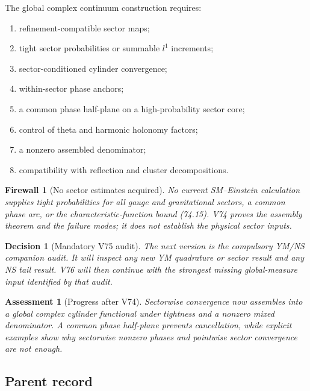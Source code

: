 \documentclass[11pt]{article}
\newtheorem{assessment}[theorem]{Assessment}
\newtheorem{firewall}[theorem]{Firewall}
\newtheorem{decision}[theorem]{Decision}
\begin{document}
\begin{ledger}
\label{led:v11v74-data}
The global complex continuum construction requires:
\begin{enumerate}
\item refinement-compatible sector maps;
\item tight sector probabilities or summable \(l^1\) increments;
\item sector-conditioned cylinder convergence;
\item within-sector phase anchors;
\item a common phase half-plane on a high-probability sector core;
\item control of theta and harmonic holonomy factors;
\item a nonzero assembled denominator;
\item compatibility with reflection and cluster decompositions.
\end{enumerate}
\end{ledger}

\begin{firewall}[No sector estimates acquired]
\label{fire:v11v74-boundary}
No current SM--Einstein calculation supplies tight probabilities for
all gauge and gravitational sectors, a common phase arc, or the
characteristic-function bound (74.15).  V74 proves the assembly theorem
and the failure modes; it does not establish the physical sector
inputs.
\end{firewall}

\begin{decision}[Mandatory V75 audit]
\label{dec:v11v74-next}
The next version is the compulsory YM/NS companion audit.  It will
inspect any new YM quadrature or sector result and any NS tail result.
V76 will then continue with the strongest missing global-measure
input identified by that audit.
\end{decision}

\begin{assessment}[Progress after V74]
\label{ass:v11v74-status}
Sectorwise convergence now assembles into a global complex cylinder
functional under tightness and a nonzero mixed denominator.  A common
phase half-plane prevents cancellation, while explicit examples show
why sectorwise nonzero phases and pointwise sector convergence are not
enough.
\end{assessment}

\subsection{Parent record}
\end{document}
